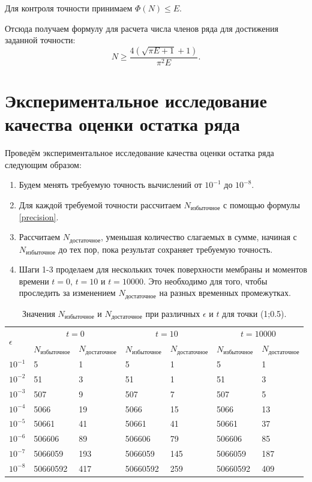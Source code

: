 {{Для контроля точности принимаем $\Phi(N) \le E$.

Отсюда получаем формулу для расчета числа членов ряда для достижения заданной точности:
\begin{equation}\label{precision}
	N \ge \dfrac{4(\sqrt{\pi E + 1}+1)}{\pi^2 E}.
\end{equation}
}

\newpage
\section{Экспериментальное исследование качества оценки остатка ряда }
{
Проведём экспериментальное исследование качества оценки остатка ряда следующим образом:
\begin{enumerate}
\item {
	Будем менять требуемую точность вычислений от $10^{-1}$ до $10^{-8}$.
}
\item {
	Для каждой требуемой точности рассчитаем $N_\text{избыточное}$ с помощью формулы \eqref{precision}.
}
\item {
	Рассчитаем $N_\text{достаточное}$, уменьшая количество слагаемых в сумме, начиная с $N_\text{избыточное}$ до тех пор, пока результат сохраняет требуемую точность.
}
\item {
	Шаги 1-3 проделаем для нескольких точек поверхности мембраны и моментов времени $t = 0$, $t = 10$ и $t = 10000$. Это необходимо для того, чтобы проследить за изменением $N_\text{достаточное}$ на разных временных промежутках.
}
\end{enumerate}

\begin{table}[H]
\centering
\caption{Значения $N_\text{избыточное}$ и $N_\text{достаточное}$ при различных $\epsilon$ и $t$ для точки (1;0.5).}
\begin{tabularx}{\textwidth}{|Y|Y|Y|Y|Y|Y|Y|}
\hline
{} &  &  &  \\ 
 & $N_\text{избыточное}$ & $N_\text{достаточное}$  & $N_\text{избыточное}$ & $N_\text{достаточное}$  & $N_\text{избыточное}$ & $N_\text{достаточное}$  \\ \hline
$10^{-1}$ & 5 & 1 & 5 & 1 & 5 & 1 \\ \hline
$10^{-2}$ & 51 & 3 & 51 & 1 & 51 & 3 \\ \hline
$10^{-3}$ & 507 & 9 & 507 & 7 & 507 & 5 \\ \hline
$10^{-4}$ & 5066 & 19 & 5066 & 15 & 5066 & 13 \\ \hline
$10^{-5}$ & 50661 & 41 & 50661 & 41 & 50661 & 37 \\ \hline
$10^{-6}$ & 506606 & 89 & 506606 & 79 & 506606 & 85 \\ \hline
$10^{-7}$ & 5066059 & 193 & 5066059 & 145 & 5066059 & 187 \\ \hline
$10^{-8}$ & 50660592 & 417 & 50660592 & 259 & 50660592 & 409 \\ \hline
\end{tabularx}
\end{table}

}}
